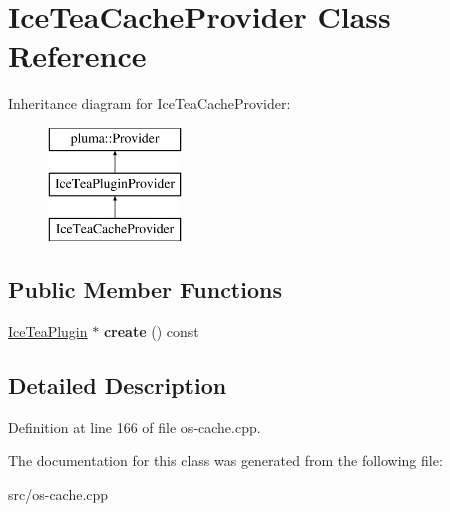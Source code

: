 \hypertarget{class_ice_tea_cache_provider}{}\section{Ice\+Tea\+Cache\+Provider Class Reference}
\label{class_ice_tea_cache_provider}
Inheritance diagram for Ice\+Tea\+Cache\+Provider\+:\begin{figure}[H]
\begin{center}
\leavevmode
\includegraphics[height=3.000000cm]{class_ice_tea_cache_provider}
\end{center}
\end{figure}
\subsection*{Public Member Functions}
\begin{DoxyCompactItemize}
\item 
\hyperlink{class_ice_tea_plugin}{Ice\+Tea\+Plugin} $\ast$ {\bfseries create} () const \hypertarget{class_ice_tea_cache_provider_a2f2b3203c0eabf1c464174200c8ae354}{}\label{class_ice_tea_cache_provider_a2f2b3203c0eabf1c464174200c8ae354}

\end{DoxyCompactItemize}


\subsection{Detailed Description}


Definition at line 166 of file os-\/cache.\+cpp.



The documentation for this class was generated from the following file\+:\begin{DoxyCompactItemize}
\item 
src/os-\/cache.\+cpp\end{DoxyCompactItemize}
